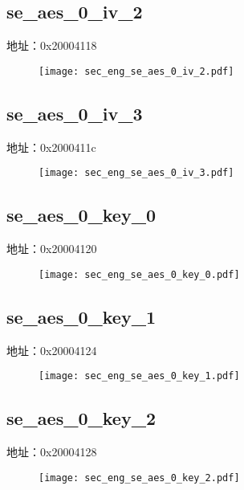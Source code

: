 \subsection{se\_aes\_0\_iv\_2}
\label{sec_eng-se-aes-0-iv-2}
地址：0x20004118
 \begin{figure}[H]
\texttt{[image: sec\_eng\_se\_aes\_0\_iv\_2.pdf]}
\end{figure}

\subsection{se\_aes\_0\_iv\_3}
\label{sec_eng-se-aes-0-iv-3}
地址：0x2000411c
 \begin{figure}[H]
\texttt{[image: sec\_eng\_se\_aes\_0\_iv\_3.pdf]}
\end{figure}

\subsection{se\_aes\_0\_key\_0}
\label{sec_eng-se-aes-0-key-0}
地址：0x20004120
 \begin{figure}[H]
\texttt{[image: sec\_eng\_se\_aes\_0\_key\_0.pdf]}
\end{figure}

\subsection{se\_aes\_0\_key\_1}
\label{sec_eng-se-aes-0-key-1}
地址：0x20004124
 \begin{figure}[H]
\texttt{[image: sec\_eng\_se\_aes\_0\_key\_1.pdf]}
\end{figure}

\subsection{se\_aes\_0\_key\_2}
\label{sec_eng-se-aes-0-key-2}
地址：0x20004128
 \begin{figure}[H]
\texttt{[image: sec\_eng\_se\_aes\_0\_key\_2.pdf]}
\end{figure}

